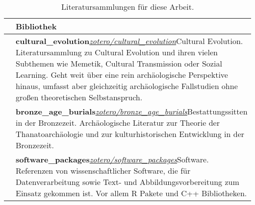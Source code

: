 \documentclass[openany,twoside,twocolumn]{book}
\begin{document}
\begin{table}

\caption{\label{tab:libraries}Literatursammlungen für diese Arbeit.}
\centering
\fontsize{8}{10}\selectfont
\begin{tabu} to 
\toprule
 & Bibliothek\\
 & \textbf{cultural\_evolution}\newline \textit{\href{https://www.zotero.org/groups/2086516/cultural\_evolution}{zotero/cultural\_evolution}}\newline Cultural Evolution. Literatursammlung zu Cultural Evolution und ihren vielen Subthemen wie Memetik, Cultural Transmission oder Sozial Learning. Geht weit über eine rein archäologische Perspektive hinaus, umfasst aber gleichzeitig archäologische Fallstudien ohne großen theoretischen Selbstanspruch.\\
\addlinespace \hline {} & \textbf{bronze\_age\_burials}\newline \textit{\href{https://www.zotero.org/groups/2199051/bronze\_age\_burials}{zotero/bronze\_age\_burials}}\newline Bestattungssitten in der Bronzezeit. Archäologische Literatur zur Theorie der Thanatoarchäologie und zur kulturhistorischen Entwicklung in der Bronzezeit.\\
\addlinespace \hline {} & \textbf{software\_packages}\newline \textit{\href{https://www.zotero.org/groups/2211203/software\_packages}{zotero/software\_packages}}\newline Software. Referenzen von wissenschaftlicher Software, die für Datenverarbeitung sowie Text- und Abbildungsvorbereitung zum Einsatz gekommen ist. Vor allem R Pakete und C++ Bibliotheken.\\
\bottomrule
\end{tabu}
\end{table}
\end{document}
